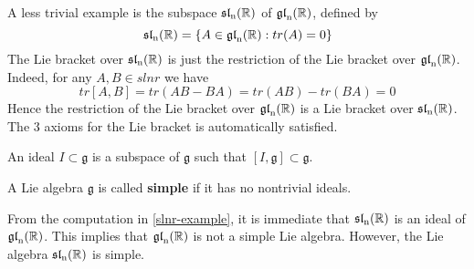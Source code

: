\begin{example}\label{slnr-example}
    A less trivial example is the subspace $\operatorname{\mathfrak{sl}_n(\mathbb{R})}$ of $\operatorname{\mathfrak{gl}_n(\mathbb{R})}$, defined by 
    \[\operatorname{\mathfrak{sl}_n(\mathbb{R})} = \left\lbrace A \in \operatorname{\mathfrak{gl}_n(\mathbb{R})} : tr(A) = 0\right\rbrace\]
    The Lie bracket over $\operatorname{\mathfrak{sl}_n(\mathbb{R})}$ is just the restriction of the Lie bracket over $\operatorname{\mathfrak{gl}_n(\mathbb{R})}$. Indeed, for 
    any $A,B \in slnr$ we have 
    \[tr[A,B] = tr(AB-BA)= tr(AB)-tr(BA)=0\]
    Hence the restriction of the Lie bracket over $\operatorname{\mathfrak{gl}_n(\mathbb{R})}$ is a Lie bracket over $\operatorname{\mathfrak{sl}_n(\mathbb{R})}$. The 3 axioms for the Lie bracket is automatically satisfied. 
\end{example}
\begin{definition}\label{ideal}
    An ideal $I \subset \mathfrak{g}$ is a subspace of $\mathfrak{g}$ such that $[I,\mathfrak{g}] \subset \mathfrak{g}$.
\end{definition}
\begin{definition}\label{simple-lie algebra}
    A Lie algebra $\mathfrak{g}$ is called \textbf{simple} if it has no nontrivial ideals.
\end{definition}
From the computation in \ref{slnr-example}, it is immediate that $\operatorname{\mathfrak{sl}_n(\mathbb{R})}$ is an ideal of $\operatorname{\mathfrak{gl}_n(\mathbb{R})}$. This implies that $\operatorname{\mathfrak{gl}_n(\mathbb{R})}$ 
is not a simple Lie algebra. However, the Lie algebra $\operatorname{\mathfrak{sl}_n(\mathbb{R})}$ is simple. 
